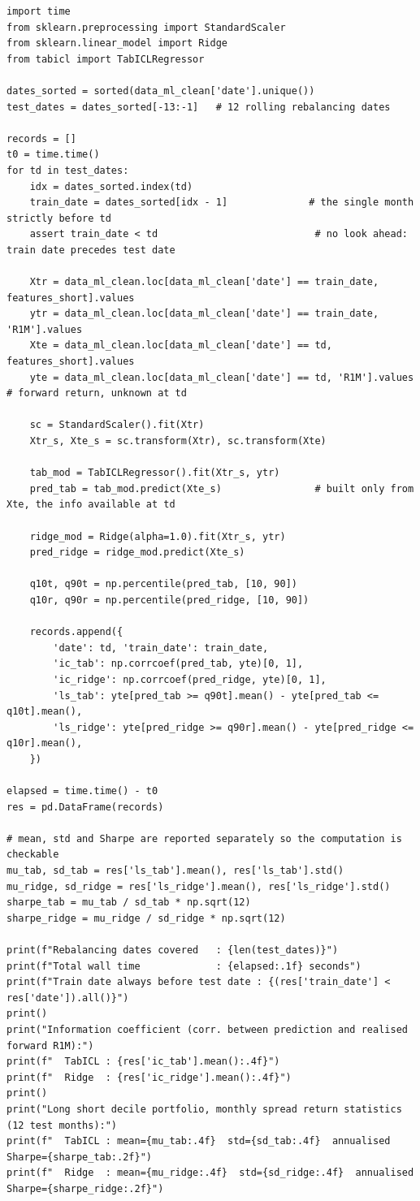 \begin{verbatim}
import time
from sklearn.preprocessing import StandardScaler
from sklearn.linear_model import Ridge
from tabicl import TabICLRegressor

dates_sorted = sorted(data_ml_clean['date'].unique())
test_dates = dates_sorted[-13:-1]   # 12 rolling rebalancing dates

records = []
t0 = time.time()
for td in test_dates:
    idx = dates_sorted.index(td)
    train_date = dates_sorted[idx - 1]              # the single month strictly before td
    assert train_date < td                           # no look ahead: train date precedes test date

    Xtr = data_ml_clean.loc[data_ml_clean['date'] == train_date, features_short].values
    ytr = data_ml_clean.loc[data_ml_clean['date'] == train_date, 'R1M'].values
    Xte = data_ml_clean.loc[data_ml_clean['date'] == td, features_short].values
    yte = data_ml_clean.loc[data_ml_clean['date'] == td, 'R1M'].values   # forward return, unknown at td

    sc = StandardScaler().fit(Xtr)
    Xtr_s, Xte_s = sc.transform(Xtr), sc.transform(Xte)

    tab_mod = TabICLRegressor().fit(Xtr_s, ytr)
    pred_tab = tab_mod.predict(Xte_s)                # built only from Xte, the info available at td

    ridge_mod = Ridge(alpha=1.0).fit(Xtr_s, ytr)
    pred_ridge = ridge_mod.predict(Xte_s)

    q10t, q90t = np.percentile(pred_tab, [10, 90])
    q10r, q90r = np.percentile(pred_ridge, [10, 90])

    records.append({
        'date': td, 'train_date': train_date,
        'ic_tab': np.corrcoef(pred_tab, yte)[0, 1],
        'ic_ridge': np.corrcoef(pred_ridge, yte)[0, 1],
        'ls_tab': yte[pred_tab >= q90t].mean() - yte[pred_tab <= q10t].mean(),
        'ls_ridge': yte[pred_ridge >= q90r].mean() - yte[pred_ridge <= q10r].mean(),
    })

elapsed = time.time() - t0
res = pd.DataFrame(records)

# mean, std and Sharpe are reported separately so the computation is checkable
mu_tab, sd_tab = res['ls_tab'].mean(), res['ls_tab'].std()
mu_ridge, sd_ridge = res['ls_ridge'].mean(), res['ls_ridge'].std()
sharpe_tab = mu_tab / sd_tab * np.sqrt(12)
sharpe_ridge = mu_ridge / sd_ridge * np.sqrt(12)

print(f"Rebalancing dates covered   : {len(test_dates)}")
print(f"Total wall time             : {elapsed:.1f} seconds")
print(f"Train date always before test date : {(res['train_date'] < res['date']).all()}")
print()
print("Information coefficient (corr. between prediction and realised forward R1M):")
print(f"  TabICL : {res['ic_tab'].mean():.4f}")
print(f"  Ridge  : {res['ic_ridge'].mean():.4f}")
print()
print("Long short decile portfolio, monthly spread return statistics (12 test months):")
print(f"  TabICL : mean={mu_tab:.4f}  std={sd_tab:.4f}  annualised Sharpe={sharpe_tab:.2f}")
print(f"  Ridge  : mean={mu_ridge:.4f}  std={sd_ridge:.4f}  annualised Sharpe={sharpe_ridge:.2f}")
\end{verbatim}

